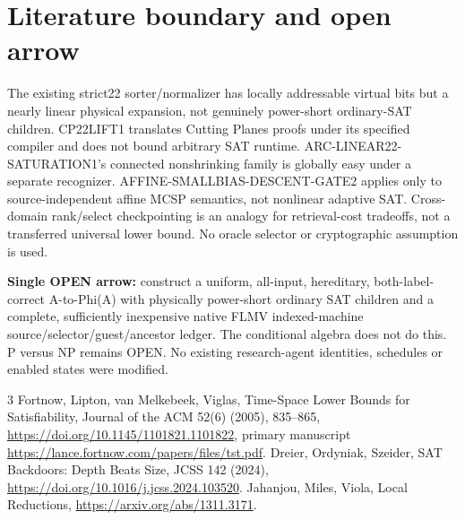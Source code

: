 \documentclass[11pt]{article}
\begin{document}
\section{Literature boundary and open arrow}
The existing strict22 sorter/normalizer has locally addressable virtual bits but a nearly linear physical expansion, not genuinely power-short ordinary-SAT children. CP22LIFT1 translates Cutting Planes proofs under its specified compiler and does not bound arbitrary SAT runtime. ARC-LINEAR22-SATURATION1's connected nonshrinking family is globally easy under a separate recognizer. AFFINE-SMALLBIAS-DESCENT-GATE2 applies only to source-independent affine MCSP semantics, not nonlinear adaptive SAT. Cross-domain rank/select checkpointing is an analogy for retrieval-cost tradeoffs, not a transferred universal lower bound. No oracle selector or cryptographic assumption is used.

\noindent\textbf{Single OPEN arrow:} construct a uniform, all-input, hereditary, both-label-correct A-to-Phi(A) with physically power-short ordinary SAT children and a complete, sufficiently inexpensive native FLMV indexed-machine source/selector/guest/ancestor ledger. The conditional algebra does not do this. P versus NP remains OPEN. No existing research-agent identities, schedules or enabled states were modified.

\begin{thebibliography}{3}
 Fortnow, Lipton, van Melkebeek, Viglas, Time-Space Lower Bounds for Satisfiability, Journal of the ACM 52(6) (2005), 835--865, \url{https://doi.org/10.1145/1101821.1101822}, primary manuscript \url{https://lance.fortnow.com/papers/files/tst.pdf}.
 Dreier, Ordyniak, Szeider, SAT Backdoors: Depth Beats Size, JCSS 142 (2024), \url{https://doi.org/10.1016/j.jcss.2024.103520}.
 Jahanjou, Miles, Viola, Local Reductions, \url{https://arxiv.org/abs/1311.3171}.
\end{thebibliography}
\end{document}
